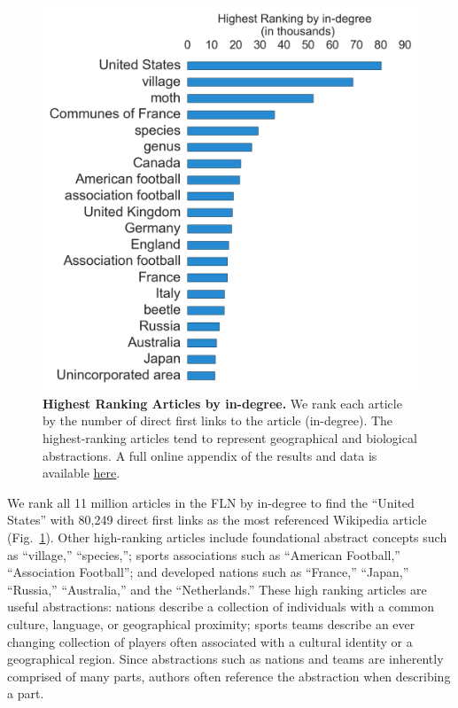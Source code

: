 \documentclass[pre,twocolumn,twoside,superscriptaddress,floatfix]{revtex4-1}
\begin{document}
{\begin{figure}[tp!]
  \includegraphics[width=\columnwidth]{fig005_articles_ndegree.pdf}
  \caption{
    \textbf{Highest Ranking Articles by in-degree.}
    We rank each article by the number of direct first links to the article (in-degree). The highest-ranking articles tend to represent geographical and biological abstractions. A full online appendix of the results and data is available \href{http://compstorylab.org/share/papers/ibrahim2016a/index.html}{here}.}
  \label{fig:indegree list}
\end{figure}
We rank all 11 million articles in the FLN by in-degree to find 
the ``United States'' with 80,249 direct first links as the most referenced
Wikipedia article 
(Fig.~\ref{fig:indegree list}). 
Other high-ranking articles
include foundational abstract concepts such as ``village,'' ``species,''; 
sports associations such as ``American Football,'' ``Association Football''; 
and developed nations such as ``France,'' ``Japan,'' ``Russia,'' ``Australia,'' and 
the ``Netherlands.'' These high ranking articles are useful abstractions: nations
describe a collection of individuals with a common culture, language, or 
geographical proximity; sports teams describe an ever changing collection of 
players often associated with a cultural identity or a geographical 
region. 
Since abstractions such as nations and teams are inherently comprised
of many parts, authors often reference the abstraction when describing a part.

}
\end{document}
